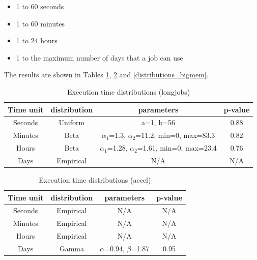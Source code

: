 \documentclass{wscpaperproc}
\begin{document}
\begin{itemize}
    \item 1 to 60 seconds
    \item 1 to 60 minutes
    \item 1 to 24 hours
    \item 1 to the maximum number of days that a job can use
\end{itemize}

The results are shown in Tables \ref{distributions_longjobs},
\ref{distributions_accel} and \ref{distributions_bigmem}.

\begin{table}[h!]
    \centering
    \begin{tabular}{ | c | c | c | c |}
        \hline
        \textbf{Time unit} & \textbf{distribution} & \textbf{parameters} & \textbf{p-value} \\
        \hline
        Seconds & Uniform & a=1, b=56 & 0.88 \\
        \hline
        Minutes & Beta & $\alpha_1$=1.3, $\alpha_2$=11.2, min=0, max=83.3 & 0.82 \\
        \hline
        Hours & Beta & $\alpha_1$=1.28, $\alpha_2$=1.61, min=0, max=23.4 & 0.76 \\
        \hline
        Days & Empirical & N/A & N/A \\
        \hline
    \end{tabular}
    \caption{Execution time distributions (longjobs)}
    \label{distributions_longjobs}
\end{table}

\begin{table}[h!]
    \centering
    \begin{tabular}{ | c | c | c | c |}
        \hline
        \textbf{Time unit} & \textbf{distribution} & \textbf{parameters} & \textbf{p-value} \\
        \hline
        Seconds & Empirical & N/A & N/A \\
        \hline
        Minutes & Empirical & N/A & N/A \\
        \hline
        Hours & Empirical & N/A & N/A \\
        \hline
        Days & Gamma & $\alpha$=0.94, $\beta$=1.87 & 0.95 \\
        \hline
    \end{tabular}
    \caption{Execution time distributions (accel)}
    \label{distributions_accel}
\end{table}
\end{document}

